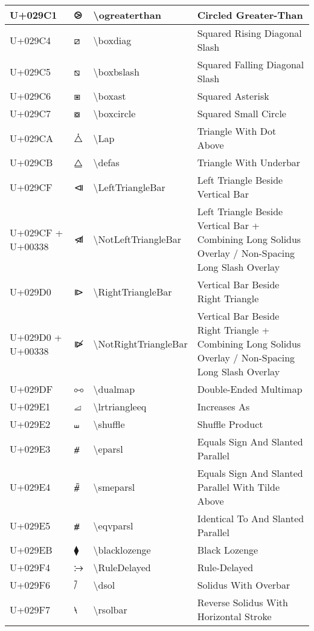 \begin{table}[h]
\begin{tabulary}{\linewidth}{|L|L|L|L|}
\hline
U+029C1 & ⧁ & {\textbackslash}ogreaterthan & Circled Greater-Than \\
\hline
U+029C4 & ⧄ & {\textbackslash}boxdiag & Squared Rising Diagonal Slash \\
\hline
U+029C5 & ⧅ & {\textbackslash}boxbslash & Squared Falling Diagonal Slash \\
\hline
U+029C6 & ⧆ & {\textbackslash}boxast & Squared Asterisk \\
\hline
U+029C7 & ⧇ & {\textbackslash}boxcircle & Squared Small Circle \\
\hline
U+029CA & ⧊ & {\textbackslash}Lap & Triangle With Dot Above \\
\hline
U+029CB & ⧋ & {\textbackslash}defas & Triangle With Underbar \\
\hline
U+029CF & ⧏ & {\textbackslash}LeftTriangleBar & Left Triangle Beside Vertical Bar \\
\hline
U+029CF + U+00338 & ⧏̸ & {\textbackslash}NotLeftTriangleBar & Left Triangle Beside Vertical Bar + Combining Long Solidus Overlay / Non-Spacing Long Slash Overlay \\
\hline
U+029D0 & ⧐ & {\textbackslash}RightTriangleBar & Vertical Bar Beside Right Triangle \\
\hline
U+029D0 + U+00338 & ⧐̸ & {\textbackslash}NotRightTriangleBar & Vertical Bar Beside Right Triangle + Combining Long Solidus Overlay / Non-Spacing Long Slash Overlay \\
\hline
U+029DF & ⧟ & {\textbackslash}dualmap & Double-Ended Multimap \\
\hline
U+029E1 & ⧡ & {\textbackslash}lrtriangleeq & Increases As \\
\hline
U+029E2 & ⧢ & {\textbackslash}shuffle & Shuffle Product \\
\hline
U+029E3 & ⧣ & {\textbackslash}eparsl & Equals Sign And Slanted Parallel \\
\hline
U+029E4 & ⧤ & {\textbackslash}smeparsl & Equals Sign And Slanted Parallel With Tilde Above \\
\hline
U+029E5 & ⧥ & {\textbackslash}eqvparsl & Identical To And Slanted Parallel \\
\hline
U+029EB & ⧫ & {\textbackslash}blacklozenge & Black Lozenge \\
\hline
U+029F4 & ⧴ & {\textbackslash}RuleDelayed & Rule-Delayed \\
\hline
U+029F6 & ⧶ & {\textbackslash}dsol & Solidus With Overbar \\
\hline
U+029F7 & ⧷ & {\textbackslash}rsolbar & Reverse Solidus With Horizontal Stroke \\

\end{tabulary}
\end{table}
